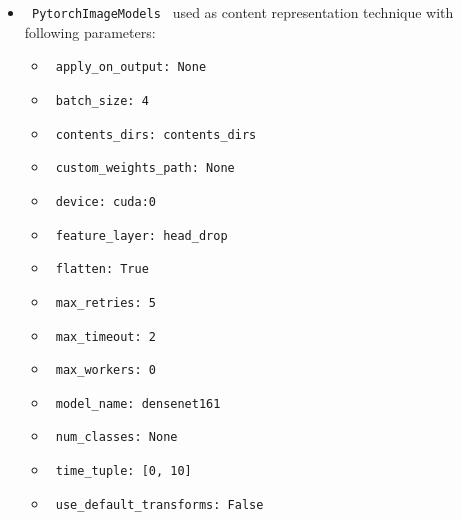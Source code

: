 \documentclass[11pt]{article}
\begin{document}
\begin{itemize}
                                                            
            \item
        \verb| PytorchImageModels | used as content representation technique with following parameters:
        \begin{itemize}
                            \item
                \verb| apply_on_output: None|
                            \item
                \verb| batch_size: 4|
                            \item
                \verb| contents_dirs: contents_dirs|
                            \item
                \verb| custom_weights_path: None|
                            \item
                \verb| device: cuda:0|
                            \item
                \verb| feature_layer: head_drop|
                            \item
                \verb| flatten: True|
                            \item
                \verb| max_retries: 5|
                            \item
                \verb| max_timeout: 2|
                            \item
                \verb| max_workers: 0|
                            \item
                \verb| model_name: densenet161|
                            \item
                \verb| num_classes: None|
                            \item
                \verb| time_tuple: [0, 10]|
                            \item
                \verb| use_default_transforms: False|
                    \end{itemize}
    \end{itemize}
\hfill\break
\hfill\break
\end{document}
